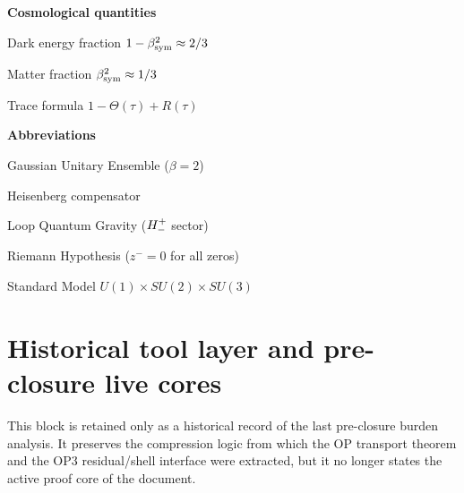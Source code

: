 \begin{minipage}[t]{0.48\textwidth}
\medskip
\noindent\textbf{Cosmological quantities}
\begin{description}[leftmargin=1.8em, labelindent=0pt, itemsep=1pt]
  \item[$\Omega_\Lambda$] Dark energy fraction $1-\beta_{\mathrm{sym}}^2\approx 2/3$
  \item[$\Omega_M$] Matter fraction $\beta_{\mathrm{sym}}^2\approx 1/3$
  \item[$\Sigma(\tau)$] Trace formula $1-\Theta(\tau)+R(\tau)$
\end{description}

\medskip
\noindent\textbf{Abbreviations}
\begin{description}[leftmargin=1.8em, labelindent=0pt, itemsep=1pt]
  \item[GUE] Gaussian Unitary Ensemble ($\beta=2$)
  \item[HC] Heisenberg compensator
  \item[LQG] Loop Quantum Gravity ($H^+_-$ sector)
  \item[RH] Riemann Hypothesis ($z^-=0$ for all zeros)
  \item[SM] Standard Model $U(1)\times SU(2)\times SU(3)$
\end{description}
\end{minipage}


\clearpage

\section*{Historical tool layer and pre-closure live cores}
\begin{remark}
This block is retained only as a historical record of the last pre-closure burden analysis. It preserves the compression logic from which the OP transport theorem and the OP3 residual/shell interface were extracted, but it no longer states the active proof core of the document.
\end{remark}

